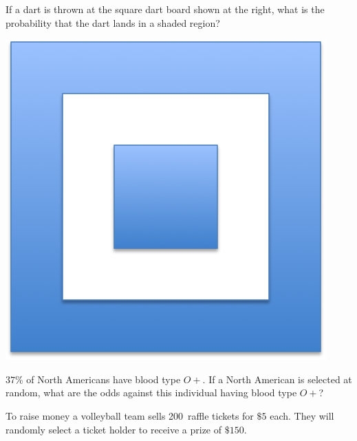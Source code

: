 \documentclass[addpoints,12pt]{exam}
\begin{document}
\begin{questions}

\question[10]
\begin{multicols}{2}
If a dart is thrown at the square dart board shown at the right,
what is the probability that the dart lands in a shaded region?\\
\begin{center}\includegraphics[scale=.5]{Dart}\end{center}
\end{multicols}

\question[10] $37\%$ of North Americans have blood type $O+$.
If a North American is selected at random, what are the odds
against this individual having blood type $O+$?

\question[12] To raise money a volleyball team sells 200~raffle tickets
for $\$5$ each. They will randomly select a ticket holder to receive
a prize of $\$150$.
\end{questions}
\end{document}
